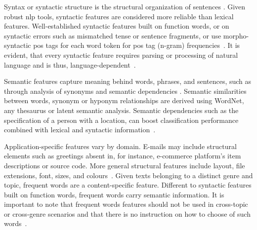 \begin{table}[]
\centering
\caption{Comparison of a subset of lexical features~\citep{stamatatos_survey_2009}. Requirements refer to computational requirements such as a tokenizer.}
\label{tab:comp_lexical}
\end{table}

Syntax or syntactic structure is the structural organization of sentences \citep{kurt_pehlivanoglu_comparative_2024}.
Given robust \ac{nlp} tools, syntactic features are considered more reliable than lexical features.
Well-established syntactic features built on function words, or on syntactic errors such as mismatched tense or sentence fragments, or use morpho-syntactic \ac{pos} tags for each word token for \ac{pos} tag (n-gram) frequencies~\citep{abbasi_writeprints_2008,stamatatos_survey_2009}.
It is evident, that every syntactic feature requires parsing or processing of natural language and is thus, language-dependent~\citep{neal_surveying_2018,stamatatos_survey_2009}.

Semantic features capture meaning behind words, phrases, and sentences, such as through analysis of synonyms and semantic dependencies \citep{neal_surveying_2018}.
Semantic similarities between words, synonym or hyponym relationships are derived using WordNet, any thesaurus or latent semantic analysis.
Semantic dependencies such as the specification of a person with a location, can boost classification performance combined with lexical and syntactic information~\cite{stamatatos_survey_2009}.


Application-specific features vary by domain.
E-mails may include structural elements such as greetings absent in, for instance, e-commerce platform's item descriptions or source code.
More general structural features include layout, file extensions, font, sizes, and colours~\citep{abbasi_writeprints_2008,neal_surveying_2018}.
Given texts belonging to a distinct genre and topic, frequent words are a content-specific feature.
Different to syntactic features built on function words, frequent words carry semantic information.
It is important to note that frequent words features should not be used in cross-topic or cross-genre scenarios and that there is no instruction on how to choose of such words~\citep{abbasi_writeprints_2008}.
